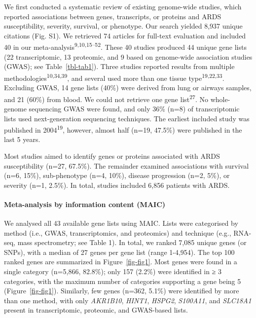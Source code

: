 \documentclass[
  11,
  a4paper,
]{article}
\let\oldparagraph\paragraph
\renewcommand{\paragraph}[1]{\oldparagraph{#1}\mbox{}}
\begin{document}
We first conducted a systematic review of existing genome-wide studies,
which reported associations between genes, transcripts, or proteins and
ARDS susceptibility, severity, survival, or phenotype. Our search
yielded 8,937 unique citations (Fig. S1). We retrieved 74 articles for
full-text evaluation and included 40 in our
meta-analysis\textsuperscript{9,10,15--52}. These 40 studies produced 44
unique gene lists (22 transcriptomic, 13 proteomic, and 9 based on
genome-wide association studies (GWAS); see Table~\ref{tbl-tab1}). Three
studies reported results from multiple
methodologies\textsuperscript{10,34,39}, and several used more than one
tissue type\textsuperscript{19,22,33}. Excluding GWAS, 14 gene lists
(40\%) were derived from lung or airways samples, and 21 (60\%) from
blood. We could not retrieve one gene list\textsuperscript{27}. No
whole-genome sequencing GWAS were found, and only 36\% (n=8) of
transcriptomic lists used next-generation sequencing techniques. The
earliest included study was published in 2004\textsuperscript{19},
however, almost half (n=19, 47.5\%) were published in the last 5 years.

Most studies aimed to identify genes or proteins associated with ARDS
susceptibility (n=27, 67.5\%). The remainder examined associations with
survival (n=6, 15\%), sub-phenotype (n=4, 10\%), disease progression
(n=2, 5\%), or severity (n=1, 2.5\%). In total, studies included 6,856
patients with ARDS.

\hypertarget{meta-analysis-by-information-content-maic}{%
\paragraph{Meta-analysis by information content
(MAIC)}\label{meta-analysis-by-information-content-maic}}

We analysed all 43 available gene lists using MAIC. Lists were
categorised by method (i.e., GWAS, transcriptomics, and proteomics) and
technique (e.g., RNA-seq, mass spectrometry; see Table 1). In total, we
ranked 7,085 unique genes (or SNPs), with a median of 27 genes per gene
list (range 1-4,954). The top 100 ranked genes are summarized in
Figure~\ref{fig-fig1}. Most genes were found in a single category
(n=5,866, 82.8\%); only 157 (2.2\%) were identified in ≥ 3 categories,
with the maximum number of categories supporting a gene being 5
(Figure~\ref{fig-fig1}). Similarly, few genes (n=362, 5.1\%) were
identified by more than one method, with only \emph{AKR1B10},
\emph{HINT1}, \emph{HSPG2}, \emph{S100A11}, and \emph{SLC18A1} present
in transcriptomic, proteomic, and GWAS-based lists.
\end{document}
